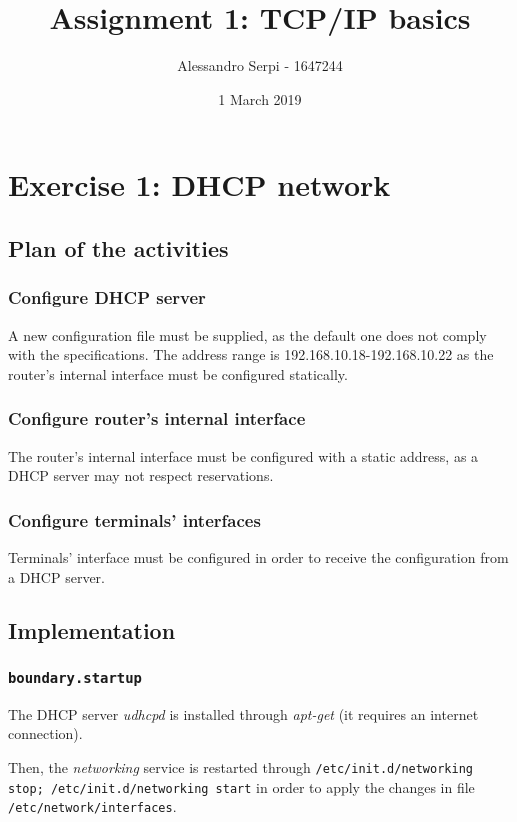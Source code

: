 \documentclass{homework}
\title{Assignment 1: TCP/IP basics}
\author{Alessandro Serpi - 1647244}
\date{1 March 2019}
\newcommand{\mt}{\texttt}
\begin{document}
    
    \maketitle
    
    
    \section{Exercise 1: DHCP network}
    
    \subsection{Plan of the activities}
    
    \subsubsection{Configure DHCP server}
    A new configuration file must be supplied, as the default one does not comply with the specifications. The address range is 192.168.10.18-192.168.10.22 as the router's internal interface must be configured statically.
    
    \subsubsection{Configure router's internal interface}
    The router's internal interface must be configured with a static address, as a DHCP server may not respect reservations.
    
    \subsubsection{Configure terminals' interfaces}
    Terminals' interface must be configured in order to receive the configuration from a DHCP server.
    
    \subsection{Implementation}
    
    \subsubsection{\mt{boundary.startup}}
    The DHCP server \textit{udhcpd} is installed through \textit{apt-get} (it requires an internet connection).
    
    Then, the \textit{networking} service is restarted through \mt{/etc/init.d/networking stop; /etc/init.d/networking start} in order to apply the changes in file \mt{/etc/network/interfaces}.
    
\end{document}
